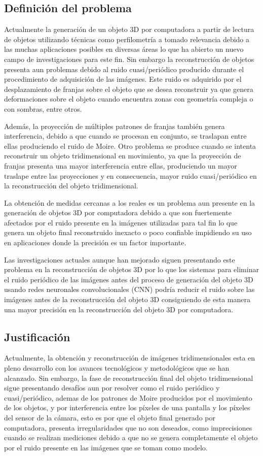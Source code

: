 \documentclass[10pt,letterpaper]{article}
\begin{document}
\subsection{Definición del problema}
Actualmente la generación de un objeto 3D por computadora a partir de lectura de objetos utilizando técnicas como perfilometría a tomado relevancia debido a las muchas aplicaciones posibles en diversas áreas lo que ha abierto un nuevo campo de investigaciones para este fin. Sin embargo la reconstrucción de objetos presenta aun problemas debido al ruido cuasi/periódico producido durante el procedimiento de adquisición de las imágenes. Este ruido es adquirido por el desplazamiento de franjas sobre el objeto que se desea reconstruir ya que genera deformaciones sobre el objeto cuando encuentra zonas con geometría compleja o con sombras, entre otros.

Además, la proyección de múltiples patrones de franjas también genera interferencia, debido a que cuando se procesan en conjunto, se traslapan entre ellas produciendo el ruido de Moire. Otro problema se produce cuando se intenta reconstruir un objeto tridimensional en movimiento, ya que la proyección de franjas presenta una mayor interferencia entre ellas, produciendo un mayor traslape entre las proyecciones y en consecuencia, mayor ruido cuasi/periódico en la reconstrucción del objeto tridimensional.    

La obtención de medidas cercanas a los reales es un problema aun presente en la generación de objetos 3D por computadora debido a que son fuertemente afectados por el ruido presente en la imágenes utilizadas para tal fin lo que genera un objeto final reconstruido inexacto o poco confiable impidiendo su uso en aplicaciones donde la precisión es un factor importante. 

Las investigaciones actuales aunque han mejorado siguen presentando este problema en la reconstrucción de objetos 3D por lo que los sistemas para eliminar el ruido periódico de las imágenes antes del proceso de generación del objeto 3D usando redes neuronales convolucionales (CNN) podría reducir el ruido sobre las imágenes antes de la reconstrucción del objeto 3D consiguiendo de esta manera una mayor precisión en la reconstrucción del objeto 3D por computadora.

\subsection{Justificación}
Actualmente, la obtención y reconstrucción de imágenes tridimensionales esta en pleno desarrollo con los avances tecnológicos y metodológicos que se han alcanzado. Sin embargo, la fase de reconstrucción final del objeto tridimensional sigue presentando desafíos aun por resolver como el ruido periódico y cuasi/periódico, ademas de los patrones de Moire producidos por el movimiento de los objetos, y por interferencia entre los píxeles de una pantalla y los píxeles del sensor de la cámara, esto es por que el objeto final generado por computadora, presenta irregularidades que no son deseados, como imprecisiones cuando se  realizan mediciones debido a que no se genera completamente el objeto por el ruido presente en las imágenes que se toman como modelo.
\end{document}
